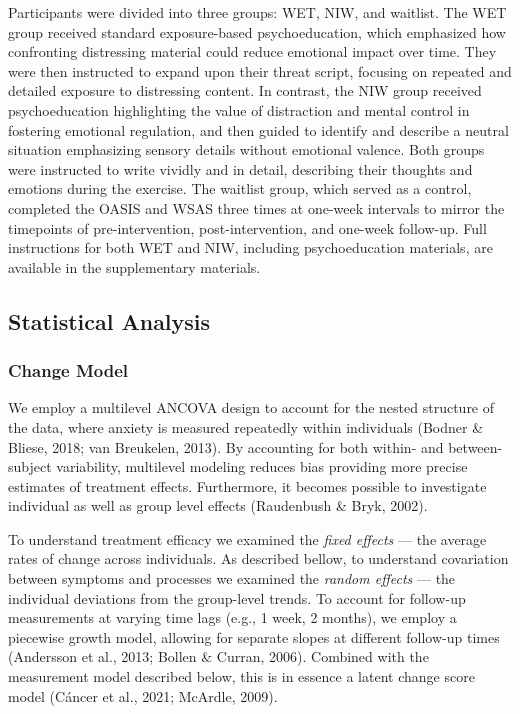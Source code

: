 \documentclass[
  man,floatsintext]{apa7}
\begin{document}
Participants were divided into three groups: WET, NIW, and waitlist.
The WET group received standard exposure-based psychoeducation, which emphasized how confronting distressing material could reduce emotional impact over time.
They were then instructed to expand upon their threat script, focusing on repeated and detailed exposure to distressing content.
In contrast, the NIW group received psychoeducation highlighting the value of distraction and mental control in fostering emotional regulation,
and then guided to identify and describe a neutral situation emphasizing sensory details without emotional valence.
Both groups were instructed to write vividly and in detail, describing their thoughts and emotions during the exercise.
The waitlist group, which served as a control, completed the OASIS and WSAS three times at one-week intervals to mirror the timepoints of pre-intervention, post-intervention, and one-week follow-up.
Full instructions for both WET and NIW, including psychoeducation materials, are available in the supplementary materials.

\subsection{Statistical Analysis}\label{statistical-analysis}

\subsubsection{Change Model}\label{change-model}

We employ a multilevel ANCOVA design to account for the nested structure of the data, where anxiety is measured repeatedly within individuals (Bodner \& Bliese, 2018; van Breukelen, 2013).
By accounting for both within- and between-subject variability, multilevel modeling reduces bias providing more precise estimates of treatment effects.
Furthermore, it becomes possible to investigate individual as well as group level effects (Raudenbush \& Bryk, 2002).

To understand treatment efficacy we examined the \emph{fixed effects} --- the average rates of change across individuals.
As described bellow, to understand covariation between symptoms and processes we examined the \emph{random effects} --- the individual deviations from the group-level trends.
To account for follow-up measurements at varying time lags (e.g., 1 week, 2 months), we employ a piecewise growth model, allowing for separate slopes at different follow-up times (Andersson et al., 2013; Bollen \& Curran, 2006).
Combined with the measurement model described below, this is in essence a latent change score model (Cáncer et al., 2021; McArdle, 2009).
\end{document}
